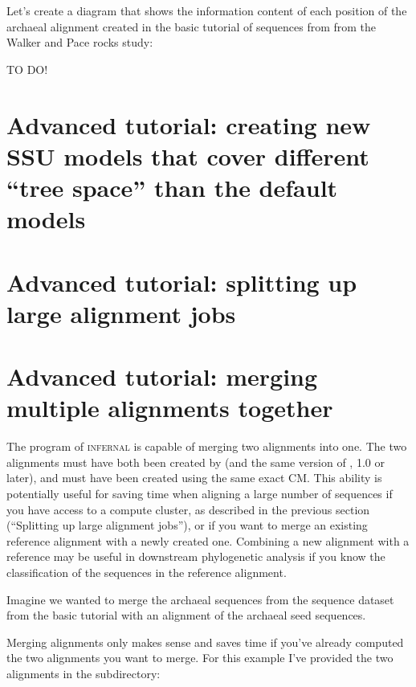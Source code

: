 Let's create a diagram that shows the information content of each
position of the archaeal alignment created in the basic tutorial of
sequences from from the Walker and Pace
rocks study:

TO DO!

\section{Advanced tutorial: creating new SSU models that cover
  different ``tree space'' than the default models}
\section{Advanced tutorial: splitting up large alignment jobs}
\section{Advanced tutorial: merging multiple alignments together}

The  program of \textsc{infernal} is capable of merging
two alignments into one. The two alignments must have both been created by
 (and the same version of , 1.0 or later),
and must have been created using the same exact CM. This ability is
potentially useful for saving time when aligning a large number of
sequences if you have access to a compute cluster, as described in the
previous section (``Splitting up large alignment jobs''), or if you
want to merge an existing reference alignment with a newly created
one. Combining a new alignment with a reference may be useful in
downstream phylogenetic analysis if you know the classification of the
sequences in the reference alignment.

Imagine we wanted to merge the archaeal sequences from the
 sequence dataset from the basic tutorial with 
an alignment of the archaeal seed sequences. 

Merging alignments only makes sense and saves time if you've already
computed the two alignments you want to merge. For this example I've
provided the two alignments in the  subdirectory:


